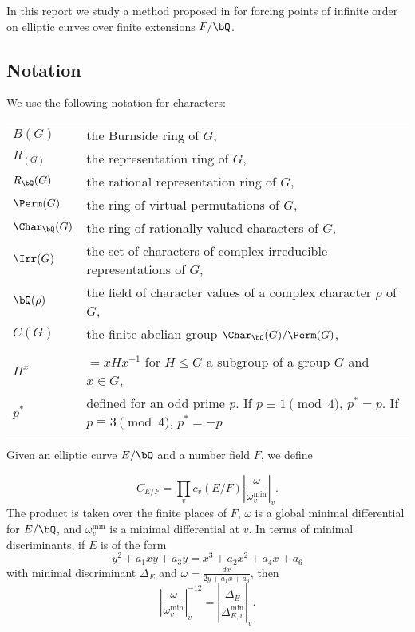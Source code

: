 In this report we study a method proposed in \cite{DEW1} for forcing points of infinite order on elliptic curves over finite extensions $F / \bQ$. 

\subsection*{Notation}
We use the following notation for characters:

\bigskip

\begin{tabular}{l | l}
    $B(G)$ & the Burnside ring of $G$, \\
    $R_(G)$ & the representation ring of $G$, \\
    $R_{\bQ}(G)$ & the rational representation ring of $G$, \\
    $\Perm(G)$ & the ring of virtual permutations of $G$, \\
    $\Char_{\bQ}(G)$ & the ring of rationally-valued characters of $G$,\\
    $\Irr(G)$ & the set of characters of complex irreducible representations of $G$, \\
    $\bQ(\rho)$ & the field of character values of a complex character $\rho$ of $G$, \\
    $C(G)$ & the finite abelian group $\Char_{\bQ}(G) / \Perm(G)$, \\ 
    \\
    $H^{x}$ & $= xHx^{-1}$  for $H \leq G$ a subgroup of a group $G$ and $x \in G$,\\
    $p^*$ & defined for an odd prime $p$. If $p \equiv 1 \pmod 4$, $p^* = p$. If $p \equiv 3 \pmod 4$, $p^* = -p$
\end{tabular}
\vspace{2em}

Given an elliptic curve $E / \bQ$ and a number field $F$, we define

\[ C_{E / F} = \prod_v c_v(E / F) \left| \frac{\omega}{\omega_v^{\min}} \right|_v. \]
The product is taken over the finite places of $F$, $\omega$ is a global minimal differential for $E / \bQ$, and $\omega_v^{\min}$ is a minimal differential at $v$. In terms of minimal discriminants, if $E$ is of the form
\[ y^2 + a_1 x y + a_3 y = x^3 + a_2 x^2 + a_4 x + a_6 \]
with minimal discriminant $\Delta_E$ and $\omega = \frac{dx}{2 y + a_1 x + a_3}$, then
\[ \left| \frac{\omega}{\omega_v^{\min}} \right|_v^{-12} = \left| \frac{\Delta_E}{\Delta_{E, v}^{\min}} \right|_v . \]